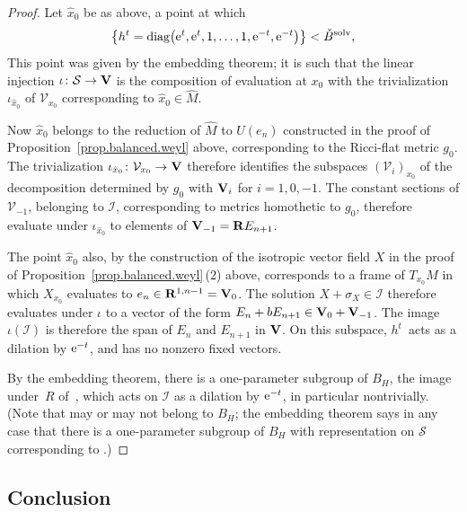 \documentclass[pdftex]{sigma}
\numberwithin{equation}{section}
\theoremstyle{definition}
\newcommand{\BR}{{\bf R}}
\begin{document}
\begin{proof}
Let $\hat{x}_0$ be as above, a point at which
\[\bigl\{ h^t = {\rm diag}\bigl({\rm e}^t, {\rm e}^{t}, 1, \dots, 1, {\rm e}^{-t},{\rm e}^{-t}\bigr) \bigr\} < \check{B}^{\rm solv},\]
This point was given by the embedding theorem; it is such that the linear injection $\iota\colon \mathcal{S} \rightarrow {\bf V}$ is the composition of evaluation at $x_0$ with the trivialization $\iota_{\hat{x}_0}$ of $\mathcal{V}_{x_0}$ corresponding to $\hat{x}_0 \in \hat{M}$.

Now $\hat{x}_0$ belongs to the reduction of $\hat{M}$ to $U(e_n)$ constructed in the proof of Proposition~\ref{prop.balanced.weyl} above, corresponding to the Ricci-flat metric $g_0$. The trivialization $\iota_{\hat{x}_0}\colon \mathcal{V}_{x_0} \rightarrow {\bf V}$ therefore identifies the subspaces $(\mathcal{V}_i)_{x_0}$ of the decomposition determined by $g_0$ with ${\bf V}_i$ for $i=1,0,-1$.
The constant sections of $\mathcal{V}_{-1}$, belonging to $\mathcal{I}$, corresponding to metrics homothetic to $g_0$, therefore evaluate under $\iota_{\hat{x}_0}$ to elements of ${\bf V}_{-1} = \BR E_{n+1}$.

The point $\hat{x}_0$ also, by the construction of the isotropic vector field $X$ in the proof of Proposition~\ref{prop.balanced.weyl}\,(2) above, corresponds to a frame of $T_{x_0} M$ in which $X_{x_0}$ evaluates to $e_n \in \BR^{1,n-1} = {\bf V}_0$.
The solution $X + \sigma_X \in \mathcal{I}$ therefore evaluates under $\iota$ to a vector of the form $E_n + b E_{n+1} \in {\bf V}_0 + {\bf V}_{-1}$.
The image $\iota(\mathcal{I})$ is therefore the span of $E_n$ and $E_{n+1}$ in ${\bf V}$. On this subspace, $h^t$~acts as a dilation by ${\rm e}^{-t}$, and has no nonzero fixed vectors.

By the embedding theorem, there is a one-parameter subgroup of $B_H$, the image under~$R$ of~, which acts on $\mathcal{I}$ as a dilation by ${\rm e}^{-t}$, in particular nontrivially. (Note that  may or may not belong to $B_H$; the embedding theorem says in any case that there is a one-parameter subgroup of $B_H$ with representation on $\mathcal{S}$ corresponding to .)
\end{proof}

\subsection{Conclusion}
\end{document}
